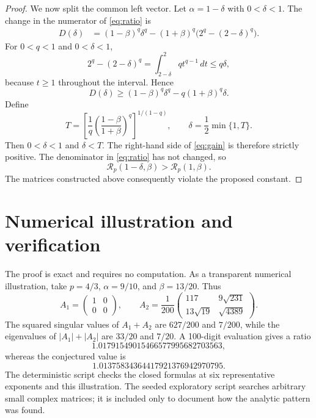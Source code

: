 \documentclass[11pt]{article}
\begin{document}
\begin{proof}
We now split the common left vector.  Let $\alpha=1-\delta$ with
$0<\delta<1$.  The change in the numerator of \eqref{eq:ratio} is
\begin{align*}
 D(\delta)
 &= (1-\beta)^q\delta^q
   -(1+\beta)^q\bigl(2^q-(2-\delta)^q\bigr).
\end{align*}
For $0<q<1$ and $0<\delta<1$,
\[
 2^q-(2-\delta)^q
 =\int_{2-\delta}^{2}q t^{q-1}\,dt
 \le q\delta,
\]
because $t\ge1$ throughout the interval.  Hence
\begin{equation}\label{eq:gain}
 D(\delta)\ge
 (1-\beta)^q\delta^q-q(1+\beta)^q\delta.
\end{equation}
Define
\[
 T=\left[
 \frac{1}{q}\left(\frac{1-\beta}{1+\beta}\right)^q
 \right]^{1/(1-q)},
 \qquad
 \delta=\frac12\min\{1,T\}.
\]
Then $0<\delta<1$ and $\delta<T$.  The right-hand side of
\eqref{eq:gain} is therefore strictly positive.  The denominator in
\eqref{eq:ratio} has not changed, so
\[
 \mathcal R_p(1-\delta,\beta)>\mathcal R_p(1,\beta).
\]
The matrices constructed above consequently violate the proposed constant.
\end{proof}

\section{Numerical illustration and verification}

The proof is exact and requires no computation.  As a transparent numerical
illustration, take $p=4/3$, $\alpha=9/10$, and $\beta=13/20$.  Thus
\[
 A_1=\begin{pmatrix}1&0\\0&0\end{pmatrix},\qquad
 A_2=\frac1{200}
 \begin{pmatrix}
 117&9\sqrt{231}\\
 13\sqrt{19}&\sqrt{4389}
 \end{pmatrix}.
\]
The squared singular values of $A_1+A_2$ are $627/200$ and $7/200$, while
the eigenvalues of $|A_1|+|A_2|$ are $33/20$ and $7/20$.  A 100-digit
evaluation gives a ratio
\[
 1.01791549015466577995682703563,
\]
whereas the conjectured value is
\[
 1.01375834364417921376942970795.
\]
The deterministic script  checks the
closed formulas at six representative exponents and this illustration.  The
seeded exploratory script  searches
arbitrary small complex matrices; it is included only to document how the
analytic pattern was found.
\end{document}
